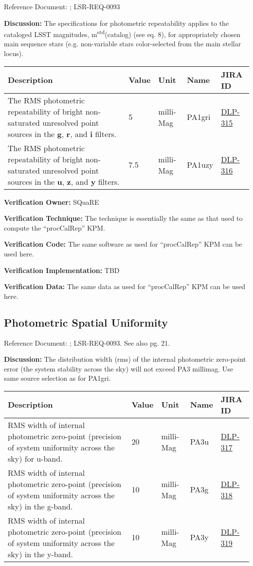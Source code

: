 \documentclass[DM,lsstdraft,toc]{lsstdoc}
\newcommand{\jira}[1]{\href{https://jira.lsstcorp.org/browse/#1}{#1}}
\begin{document}
Reference Document: ; LSR-REQ-0093

\textbf{Discussion:} The specifications for photometric repeatability
applies to the cataloged LSST magnitudes,
m\textsuperscript{std}(catalog) (see \SRD eq. 8), for appropriately
chosen main sequence stars (e.g. non-variable stars color-selected from
the main stellar locus).

\begin{longtable}[]{@{}p{}llll@{}}
\toprule
Description & Value & Unit & Name & JIRA ID\tabularnewline
\midrule
\endhead
The RMS photometric repeatability of bright non-saturated unresolved
point sources in the \textbf{g}, \textbf{r}, and \textbf{i} filters. & 5
& milli-Mag & PA1gri & \jira{DLP-315}\tabularnewline
The RMS photometric repeatability of bright non-saturated unresolved
point sources in the \textbf{u}, \textbf{z}, and \textbf{y} filters. &
7.5 & milli-Mag & PA1uzy & \jira{DLP-316}\tabularnewline
\bottomrule
\end{longtable}

\textbf{Verification Owner:} SQuaRE

\textbf{Verification Technique:} The technique is essentially the same
as that used to compute the ``procCalRep'' KPM.

\textbf{Verification Code:} The same software as used for ``procCalRep''
KPM can be used here.

\textbf{Verification Implementation:} TBD

\textbf{Verification Data:} The same data as used for ``procCalRep'' KPM
can be used here.

\subsection{Photometric Spatial
Uniformity}\label{photometric-spatial-uniformity}

Reference Document: ; LSR-REQ-0093. See also \SRD pg. 21.

\textbf{Discussion:} The distribution width (rms) of the internal
photometric zero-point error (the system stability across the sky) will
not exceed PA3 millimag. Use same source selection as for PA1gri.

\begin{longtable}[]{@{}p{}llll@{}}
\toprule
Description & Value & Unit & Name & JIRA ID\tabularnewline
\midrule
\endhead
RMS width of internal photometric zero-point (precision of system
uniformity across the sky) for u-band. & 20 & milli-Mag & PA3u &
\jira{DLP-317}\tabularnewline
RMS width of internal photometric zero-point (precision of system
uniformity across the sky) in the g-band. & 10 & milli-Mag & PA3g &
\jira{DLP-318}\tabularnewline
RMS width of internal photometric zero-point (precision of system
uniformity across the sky) in the y-band. & 10 & milli-Mag & PA3y &
\jira{DLP-319}\tabularnewline
\bottomrule
\end{longtable}
\end{document}
